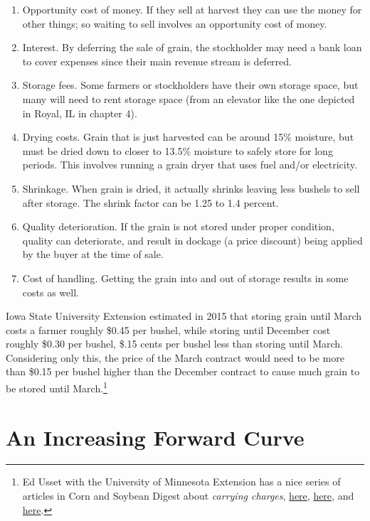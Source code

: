 \documentclass[
  letterpaper,
  DIV=11,
  numbers=noendperiod]{scrreprt}
\providecommand{\tightlist}{%
  \setlength{\itemsep}{0pt}\setlength{\parskip}{0pt}}\usepackage{longtable,booktabs,array}
\begin{document}
\begin{enumerate}
\def\labelenumi{\arabic{enumi}.}
\tightlist
\item
  Opportunity cost of money. If they sell at harvest they can use the
  money for other things; so waiting to sell involves an opportunity
  cost of money.
\item
  Interest. By deferring the sale of grain, the stockholder may need a
  bank loan to cover expenses since their main revenue stream is
  deferred.
\item
  Storage fees. Some farmers or stockholders have their own storage
  space, but many will need to rent storage space (from an elevator like
  the one depicted in Royal, IL in chapter 4).
\item
  Drying costs. Grain that is just harvested can be around 15\%
  moisture, but must be dried down to closer to 13.5\% moisture to
  safely store for long periods. This involves running a grain dryer
  that uses fuel and/or electricity.
\item
  Shrinkage. When grain is dried, it actually shrinks leaving less
  bushels to sell after storage. The shrink factor can be 1.25 to 1.4
  percent.
\item
  Quality deterioration. If the grain is not stored under proper
  condition, quality can deteriorate, and result in dockage (a price
  discount) being applied by the buyer at the time of sale.
\item
  Cost of handling. Getting the grain into and out of storage results in
  some costs as well.
\end{enumerate}

Iowa State University Extension estimated in 2015 that storing grain
until March costs a farmer roughly \$0.45 per bushel, while storing
until December cost roughly \$0.30 per bushel, \$.15 cents per bushel
less than storing until March. Considering only this, the price of the
March contract would need to be more than \$0.15 per bushel higher than
the December contract to cause much grain to be stored until
March.\footnote{Ed Usset with the University of Minnesota Extension has
  a nice series of articles in Corn and Soybean Digest about
  \emph{carrying charges},
  \href{http://www.cornandsoybeandigest.com/marketing/understand-carrying-charges}{here},
  \href{http://www.cornandsoybeandigest.com/carrying-charges-part-1}{here},
  and
  \href{http://www.cornandsoybeandigest.com/carrying-charges-part-2}{here}.}

\hypertarget{an-increasing-forward-curve}{%
\section{An Increasing Forward
Curve}\label{an-increasing-forward-curve}}
\end{document}
